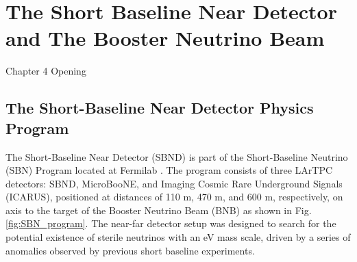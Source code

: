 \chapter{The Short Baseline Near Detector and The Booster Neutrino Beam}

\ifpdf
    \graphicspath{{Chapter4/Figs/Raster/}{Chapter4/Figs/PDF/}{Chapter4/Figs/}}
\else
    \graphicspath{{Chapter4/Figs/Vector/}{Chapter4/Figs/}}
\fi


Chapter 4 Opening

\newpage
\section{The Short-Baseline Near Detector Physics Program}


The Short-Baseline Near Detector (SBND) is part of the Short-Baseline Neutrino (SBN) Program located at Fermilab \cite{SBNProgram}. 
The program consists of three LArTPC detectors: SBND, MicroBooNE, and Imaging Cosmic Rare Underground Signals (ICARUS), positioned at distances of 110 m, 470 m, and 600 m, respectively, on axis to the target of the Booster Neutrino Beam (BNB) as shown in Fig. \ref{fig:SBN_program}.
The near-far detector setup was designed to search for the potential existence of sterile neutrinos with an eV mass scale, driven by a series of anomalies observed by previous short baseline experiments.

